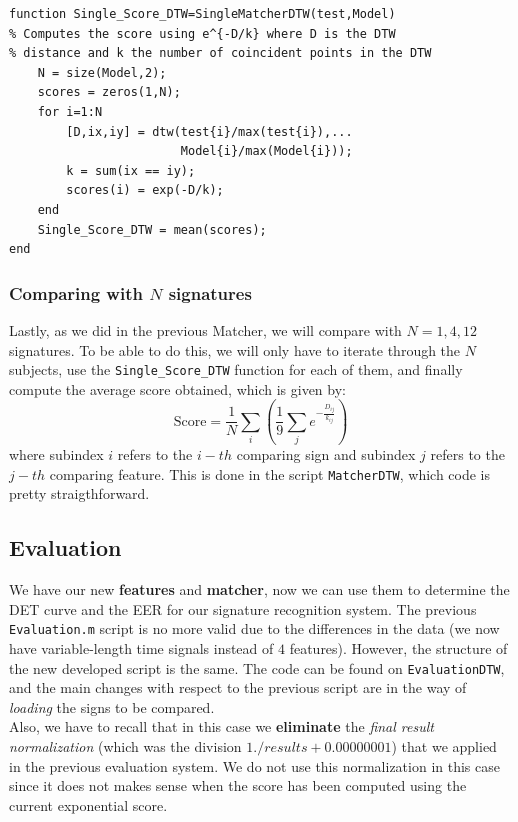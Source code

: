 \documentclass[a4paper]{article}
\def\inline{\lstinline[basicstyle=\ttfamily,keywordstyle={}]}
\begin{document}
{\begin{verbatim}
function Single_Score_DTW=SingleMatcherDTW(test,Model)
% Computes the score using e^{-D/k} where D is the DTW
% distance and k the number of coincident points in the DTW
    N = size(Model,2);
    scores = zeros(1,N);
    for i=1:N
        [D,ix,iy] = dtw(test{i}/max(test{i}),...
                        Model{i}/max(Model{i}));
        k = sum(ix == iy);
        scores(i) = exp(-D/k);
    end
    Single_Score_DTW = mean(scores);
end
\end{verbatim}

\subsubsection*{Comparing with \(N\) signatures}

Lastly, as we did in the previous Matcher, we will compare with \(N=1,4,12\) signatures. To be able to do this, we will only have to iterate through the \(N\) subjects, use the \inline{Single_Score_DTW} function for each of them, and finally compute the average score obtained, which is given by:
\[
\text{Score} = \frac{1}{N}\sum_{i} \left( \frac{1}{9}\sum_{j} e^{-\frac{D_{ij}}{k_{ij}}}\right)
\]
where subindex \(i\) refers to the \(i-th\) comparing sign and subindex \(j\) refers to the \(j-th\) comparing feature. This is done in the script \inline{MatcherDTW}, which code is pretty straigthforward.


\subsection*{Evaluation}

We have our new \textbf{features} and \textbf{matcher}, now we can use them to determine the DET curve and the EER for our signature recognition system. The previous \inline{Evaluation.m} script is no more valid due to the differences in the data (we now have variable-length time signals instead of \(4\)
features). However, the structure of the new developed script is the same.  The code can be found on \inline{EvaluationDTW}, and the main changes with respect to the previous script are in the way of \emph{loading} the signs to be compared.\\

Also, we have to recall that in this case we \textbf{eliminate} the \emph{final result normalization} (which was the division \(1./ results + 0.00000001\)) that we applied in the previous evaluation system. We do not use this normalization in this case since it does not makes sense when the score has been computed using the current exponential score.\\

}
\end{document}
